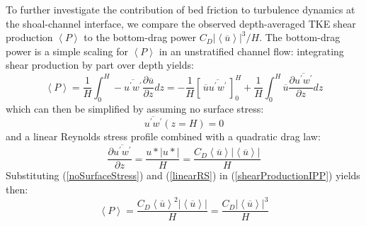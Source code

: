 To further investigate the contribution of bed friction to turbulence dynamics at the shoal-channel interface, we compare the observed depth-averaged TKE shear production $\left\langle P\right\rangle$ to the bottom-drag power $C_D \left| \left\langle \overline{u} \right\rangle \right|^{3}/H$. The bottom-drag power is a simple scaling for $\left\langle P\right\rangle$ in an unstratified channel flow: integrating shear production by part over depth yields:
\begin{equation}
\left\langle P\right\rangle = \frac{1}{H} \int_{0}^{H} -\overline{u^{\prime} w^{\prime}}\frac{\partial \overline{u}}{\partial z} dz = -\frac{1}{H} \left[\, \overline{u} \overline{u^{\prime} w^{\prime}}\,\right]_{0}^{H} + \frac{1}{H} \int_{0}^{H} \overline{u} \frac{\partial \overline{u^{\prime} w^{\prime}}}{\partial z} dz
\label{shearProductionIPP}
\end{equation}
which can then be simplified by assuming no surface stress:
\begin{equation}
\overline{u^{\prime} w^{\prime}}(z=H) = 0
\label{noSurfaceStress}
\end{equation}
and a linear Reynolds stress profile combined with a quadratic drag law:
\begin{equation}
\frac{\partial \overline{u^{\prime} w^{\prime}}}{\partial z} = \frac{u*\left| u* \right|}{H} = \frac{C_D \left\langle \overline{u} \right\rangle \left| \left\langle \overline{u} \right\rangle \right|}{H}
\label{linearRS}
\end{equation}
Substituting (\ref{noSurfaceStress}) and (\ref{linearRS}) in (\ref{shearProductionIPP}) yields then:
\begin{equation}
\left\langle P\right\rangle = \frac{C_D \left\langle \overline{u} \right\rangle^2 \left| \left\langle \overline{u} \right\rangle \right|}{H} =  \frac{C_D\left| \left\langle \overline{u} \right\rangle \right|^3}{H}
\label{shearProductionFinal}
\end{equation}

